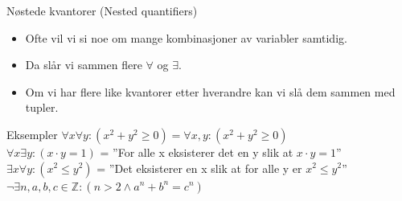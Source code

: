 \begin{frame}{Nøstede kvantorer (Nested quantifiers)}
    \begin{itemize}
        \item Ofte vil vi si noe om mange kombinasjoner av variabler samtidig.
        \item Da slår vi sammen flere $\forall$ og $\exists$.
        \item Om vi har flere like kvantorer etter hverandre kan vi slå dem sammen med tupler.
    \end{itemize}
    
    \pause
    \begin{block}{Eksempler}
        $\forall x \forall y : (x^2 + y^2 \geq 0) = \forall x, y : (x^2 + y^2 \geq 0)$ \\
        \pause
        $\forall x \exists y : (x \cdot y = 1)$ = ''For alle x eksisterer det en y slik at $x \cdot y = 1$'' \\
        \pause
        $\exists x \forall y : (x^2 \leq y^2)$ = ''Det eksisterer en x slik at for alle y er $x^2 \leq y^2$''\\
        \pause
        $\lnot \exists n, a, b, c \in \mathbb{Z} : (n > 2 \land a^n + b^n = c^n)$\\
    \end{block}
\end{frame}

